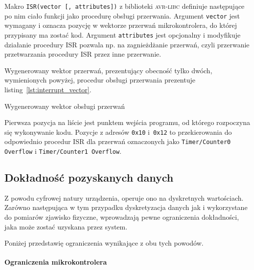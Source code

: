 Makro \texttt{ISR(vector [, attributes])} z biblioteki \textsc{avr-libc} definiuje następujące po nim ciało funkcji jako procedurę obsługi przerwania. Argument \texttt{vector} jest wymagany i oznacza pozycję w wektorze przerwań mikrokontrolera, do której przypisany ma zostać kod. Argument \texttt{attributes} jest opcjonalny i modyfikuje działanie procedury ISR \ppauza pozwala np. na zagnieżdżanie przerwań, czyli przerwanie przetwarzania procedury ISR przez inne przerwanie.

Wygenerowany wektor przerwań, prezentujący obecność tylko dwóch, wymienionych powyżej, procedur obsługi przerwania prezentuje listing~\ref{lst:interrupt_vector}.

\begin{listing}
  
  \caption[Wektor obsługi przerwań]{Wygenerowany wektor obsługi przerwań}
  \label{lst:interrupt_vector}
\end{listing}

Pierwsza pozycja na liście jest punktem wejścia programu, od którego rozpoczyna się wykonywanie kodu. Pozycje z adresów \texttt{0x10} i~\texttt{0x12} to przekierowania do odpowiednio procedur ISR dla przerwań oznaczonych jako \texttt{Timer/Counter0 Overflow} i \texttt{Timer/Counter1 Overflow}.

\subsection{Dokładność pozyskanych danych}\label{section:precision}
Z powodu cyfrowej natury urządzenia, operuje ono na dyskretnych wartościach. Zarówno następująca w tym przypadku dyskretyzacja danych jak i wykorzystane do pomiarów zjawisko fizyczne, wprowadzają pewne ograniczenia dokładności, jaka może zostać uzyskana przez system.

Poniżej przedstawię ograniczenia wynikające z obu tych powodów.

\paragraph{Ograniczenia mikrokontrolera}
\label{section:microcontroller_limit}

